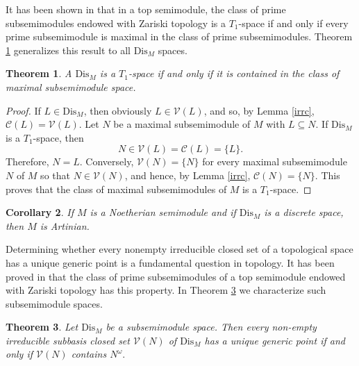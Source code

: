 \documentclass[12pt,english]{smfart}
\newtheorem{theorem}{Theorem}[section]
\newtheorem{corollary}[theorem]{Corollary}
\theoremstyle{definition}
\begin{document}
It has been shown in \cite[Theorem 3.2]{HPH21} that in a top semimodule, the class of prime subsemimodules endowed with Zariski topology is a $T_1$-space if and only if every prime subsemimodule is maximal in the class of prime subsemimodules. Theorem \ref{t1} generalizes this result to all $\mathrm{Dis}_M$ spaces.

\begin{theorem}\label{t1}
A $\mathrm{Dis}_M$ is a $T_1$-space if and only if it is contained in the class of maximal subsemimodule space. 
\end{theorem}  

\begin{proof} 
If $L\in\mathrm{Dis}_M$, then obviously $L\in\mathcal{V}(L)$, and so, by Lemma \ref{irrc}, $\mathcal{C}(L)=\mathcal{V}(L)$. Let $N$ be a maximal subsemimodule of $M$ with $L\subseteq N$. If $\mathrm{Dis}_M$ is a $T_1$-space, then   \[N\in 	\mathcal{V}(L)=\mathcal{C}(L) = \{L\}.\] Therefore, $N=L$.  
Conversely,  $\mathcal{V}(N)=\{N\}$ for every maximal subsemimodule $N$ of $M$ so that $N\in \mathcal{V}(N)$, and hence, by Lemma \ref{irrc}, $\mathcal{C}(N)=\{N\}$. This proves that the class of maximal subsemimodules of $M$ is a $T_1$-space.
\end{proof} 

\begin{corollary}
If $M$  is a Noetherian semimodule and if $\mathrm{Dis}_M$ is a discrete space, then $M$ is Artinian.  
\end{corollary}

Determining whether every nonempty irreducible closed set of a topological space has a unique generic point is a fundamental question in topology. It has been proved in \cite[Corollary 3.1]{HPH21} that the class of prime subsemimodules of a top semimodule endowed with Zariski topology has this property. In Theorem \ref{sob} we characterize such subsemimodule spaces.

\begin{theorem}\label{sob}  
Let $\mathrm{Dis}_M$ be a subsemimodule space. Then every non-empty irreducible subbasis closed set $\mathcal{V}(N)$ of $\mathrm{Dis}_M$ has a unique generic point if and only if $\mathcal{V}(N)$ contains $N^{\omega}.$ 
\end{theorem} 
\end{document}
